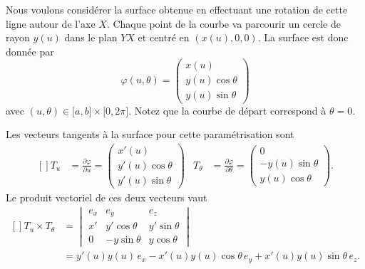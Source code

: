 Nous voulons considérer la surface obtenue en effectuant une rotation de cette ligne autour de l'axe $X$. Chaque point de la courbe va parcourir un cercle de rayon $y(u)$ dans le plan $YX$ et centré en $(x(u),0,0)$. La surface est donc donnée par
\begin{equation}
    \varphi(u,\theta)=\begin{pmatrix}
        x(u)    \\ 
        y(u)\cos\theta    \\ 
        y(u)\sin\theta    
    \end{pmatrix}
\end{equation}
avec $(u,\theta)\in\mathopen[ a , b \mathclose]\times \mathopen[ 0 , 2\pi \mathclose]$. Notez que la courbe de départ correspond à $\theta=0$.

Les vecteurs tangents à la surface pour cette paramétrisation sont
\begin{equation}
    \begin{aligned}[]
        T_u&=\frac{ \partial \varphi }{ \partial u }=\begin{pmatrix}
            x'(u)    \\ 
            y'(u)\cos\theta    \\ 
            y'(u)\sin\theta    
        \end{pmatrix}&
        T_{\theta}&=\frac{ \partial \varphi }{ \partial \theta }=\begin{pmatrix}
            0    \\ 
            -y(u)\sin\theta    \\ 
            y(u)\cos\theta    
        \end{pmatrix}.
    \end{aligned}
\end{equation}
Le produit vectoriel de ces deux vecteurs vaut
\begin{equation}
    \begin{aligned}[]
        T_u\times T_{\theta}&=\begin{vmatrix}
            e_x    &   e_y    &   e_z    \\
            x'    &   y'\cos\theta    &   y'\sin\theta    \\
            0    &   -y\sin\theta    &   y\cos\theta
        \end{vmatrix}\\
        &=y'(u)y(u)\,e_x-x'(u)y(u)\cos\theta\, e_y+x'(u)y(u)\sin\theta\, e_z.
    \end{aligned}
\end{equation}
